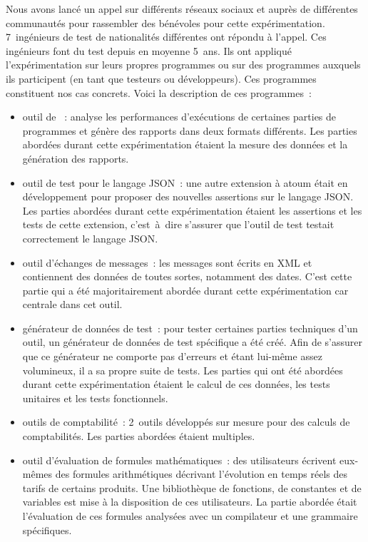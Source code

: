Nous avons lancé un appel sur différents réseaux sociaux et auprès de
différentes communautés pour rassembler des bénévoles pour cette
expérimentation. 7~ingénieurs de test de nationalités différentes ont répondu à
l'appel. Ces ingénieurs font du test depuis en moyenne 5~ans. Ils ont appliqué
l'expérimentation sur leurs propres programmes ou sur des programmes auxquels
ils participent (en tant que testeurs ou développeurs). Ces programmes
constituent nos cas concrets. Voici la description de ces programmes~:
%
\begin{itemize}

\item outil de ~: analyse les performances d'exécutions de
certaines parties de programmes et génère des rapports dans deux formats
différents. Les parties abordées durant cette expérimentation étaient la mesure
des données et la génération des rapports.

\item outil de test pour le langage JSON~: une autre extension à atoum était en
développement pour proposer des nouvelles assertions sur le langage JSON. Les
parties abordées durant cette expérimentation étaient les assertions et les
tests de cette extension, c'est~à~dire s'assurer que l'outil de test testait
correctement le langage JSON.

\item outil d'échanges de messages~: les messages sont écrits en XML et
contiennent des données de toutes sortes, notamment des dates. C'est cette
partie qui a été majoritairement abordée durant cette expérimentation car
centrale dans cet outil.

\item générateur de données de test~: pour tester certaines parties techniques
d'un outil, un générateur de données de test spécifique a été créé. Afin de
s'assurer que ce générateur ne comporte pas d'erreurs et étant lui-même assez
volumineux, il a sa propre suite de tests. Les parties qui ont été abordées
durant cette expérimentation étaient le calcul de ces données, les tests
unitaires et les tests fonctionnels.

\item outils de comptabilité~: 2~outils développés sur mesure pour des calculs
de comptabilités. Les parties abordées étaient multiples.

\item outil d'évaluation de formules mathématiques~: des utilisateurs écrivent
eux-mêmes des formules arithmétiques décrivant l'évolution en temps réels des
tarifs de certains produits. Une bibliothèque de fonctions, de constantes et de
variables est mise à la disposition de ces utilisateurs. La partie abordée était
l'évaluation de ces formules analysées avec un compilateur et une grammaire
spécifiques.

\end{itemize}

